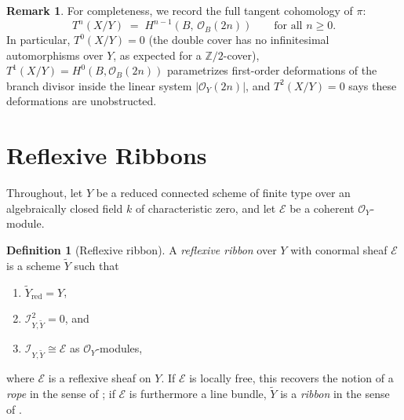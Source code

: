 \documentclass[11pt,twoside]{amsart}
\theoremstyle{plain}
\numberwithin{equation}{section}
\newcommand{\OO}{\mathcal{O}}
\newcommand{\ZZ}{\mathbb{Z}}
\theoremstyle{definition}
\newtheorem{remark}[theorem]{Remark}
\newtheorem{definition}[theorem]{Definition}
\newcommand{\cO}{\mathscr{O}}
\newcommand{\cE}{\mathscr{E}}
\newcommand{\cI}{\mathscr{I}}
\newcommand{\Yt}{\widetilde{Y}}
\begin{document}
\begin{remark}
For completeness, we record the full tangent cohomology of $\pi$:
\[
T^n(X/Y) \;=\; H^{n-1}(B,\, \OO_B(2n)) \qquad \text{for all } n \geq 0.
\]
In particular, $T^0(X/Y) = 0$ (the double cover has no infinitesimal automorphisms over $Y$, as expected for a $\ZZ/2$-cover), $T^1(X/Y) = H^0(B, \OO_B(2n))$ parametrizes first-order deformations of the branch divisor inside the linear system $|\OO_Y(2n)|$, and $T^2(X/Y) = 0$ says these deformations are unobstructed.
\end{remark}
 

\section{Reflexive Ribbons}
 
Throughout, let $Y$ be a reduced connected scheme of finite type over
an algebraically closed field $k$ of characteristic zero,
and let $\cE$ be a coherent $\cO_Y$-module.
 
\begin{definition}[Reflexive ribbon]\label{def:reflexive-ribbon}
A \emph{reflexive ribbon} over $Y$ with conormal sheaf $\cE$ is a
scheme $\Yt$ such that
\begin{enumerate}
  \item[(i)] $\Yt_{\mathrm{red}} = Y$,
  \item[(ii)] $\cI_{Y,\Yt}^{2} = 0$, and
  \item[(iii)] $\cI_{Y,\Yt} \cong \cE$ as $\cO_Y$-modules,
\end{enumerate}
where $\cE$ is a reflexive sheaf on $Y$.
If $\cE$ is locally free, this recovers the
notion of a \emph{rope} in the sense of \cite{Gon05}; if $\cE$ is
furthermore a line bundle, $\Yt$ is a \emph{ribbon} in the sense of
\cite{BE95}.
\end{definition}
 
\end{document}
